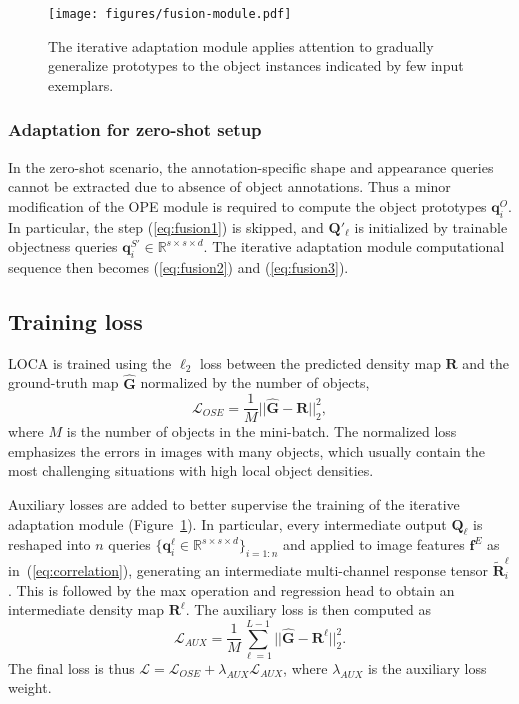 \documentclass[10pt,twocolumn,letterpaper]{article}
\begin{document}
\begin{figure}[!t]
    \centering
    \texttt{[image: figures/fusion-module.pdf]}
    \caption{The iterative adaptation module applies attention to gradually generalize prototypes to the object instances indicated by few input exemplars.}
    \label{fig:fusion}
\end{figure}

\subsubsection{Adaptation for zero-shot setup}\label{sec:zeroshot}

In the zero-shot scenario, the annotation-specific shape and appearance queries cannot be extracted due to absence of object annotations. Thus a minor modification of the OPE module is required to compute the object prototypes $\mathbf{q}_{i}^{O}$. In particular, the step (\ref{eq:fusion1}) is skipped, and $\mathbf{Q}'_\ell$ is initialized by trainable objectness queries $\mathbf{q}_{i}^{S'} \in \mathbb{R}^{s\times s \times d}$. The iterative adaptation module computational sequence then becomes (\ref{eq:fusion2}) and (\ref{eq:fusion3}).

\subsection{Training loss}  \label{sec:loss}

LOCA is trained using the $\ell_2$ loss between the predicted density map $\boldsymbol{R}$ and the ground-truth map $\boldsymbol{\hat{G}}$ normalized by the number of objects,
\begin{equation}
    \label{eq:ose}
    \mathcal{L}_{OSE} = \frac{1}{M}||\boldsymbol{\hat{G}} - \boldsymbol{R}||_2^2,
\end{equation}
where $M$ is the number of objects in the mini-batch.
The normalized loss emphasizes the errors in images with many objects, which usually contain the most challenging situations with high local object densities. 


Auxiliary losses are added to better supervise the training of the iterative adaptation module (Figure~\ref{fig:fusion}). 
In particular, every intermediate output $\mathbf{Q}_\ell$ is reshaped into $n$ queries $\{ \mathbf{q}_i^{\ell} \in \mathbb{R}^{s\times s \times d} \}_{i=1:n}$ and applied to image features $\mathbf{f}^{E}$ as in~(\ref{eq:correlation}), generating an intermediate multi-channel response tensor $\tilde{\boldsymbol{R}}_i^{\ell}$. This is followed by the max operation and regression head to obtain an intermediate density map $\boldsymbol{R}^{\ell}$. The auxiliary loss is then computed as
\begin{equation}
    \label{eq:aux_loss}
    \mathcal{L}_{AUX} =  \frac{1}{M} \sum_{\ell=1}^{L-1} ||\boldsymbol{\hat{G}} - \boldsymbol{R}^{\ell}||_2^2.
\end{equation}
The final loss is thus $\mathcal{L} = \mathcal{L}_{OSE} + \lambda_{AUX} \mathcal{L}_{AUX}$, where $\lambda_{AUX}$ is the auxiliary loss weight. 
\end{document}
